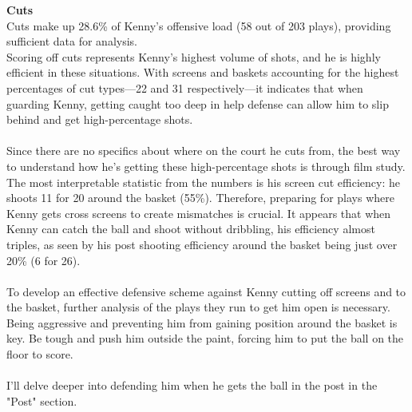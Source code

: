 \documentclass[a4paper,12pt]{article}
\begin{document}
\begin{multicols}{2}
    
    {\large \noindent \textbf{Cuts}} \\ 
    Cuts make up 28.6\% of Kenny's offensive load (58 out of 203 plays), providing sufficient data for analysis.\\
    Scoring off cuts represents Kenny's highest volume of shots, and he is highly efficient in these situations. With screens and baskets accounting for the highest percentages of cut types—22 and 31 respectively—it indicates that when guarding Kenny, getting caught too deep in help defense can allow him to slip behind and get high-percentage shots.\\ \\
    Since there are no specifics about where on the court he cuts from, the best way to understand how he's getting these high-percentage shots is through film study. The most interpretable statistic from the numbers is his screen cut efficiency: he shoots 11 for 20 around the basket (55\%). Therefore, preparing for plays where Kenny gets cross screens to create mismatches is crucial. It appears that when Kenny can catch the ball and shoot without dribbling, his efficiency almost triples, as seen by his post shooting efficiency around the basket being just over 20\% (6 for 26).\\ \\
    To develop an effective defensive scheme against Kenny cutting off screens and to the basket, further analysis of the plays they run to get him open is necessary. Being aggressive and preventing him from gaining position around the basket is key. Be tough and push him outside the paint, forcing him to put the ball on the floor to score.\\ \\
    I'll delve deeper into defending him when he gets the ball in the post in the "Post" section.\vspace{1em}
    

\end{multicols}
\end{document}
